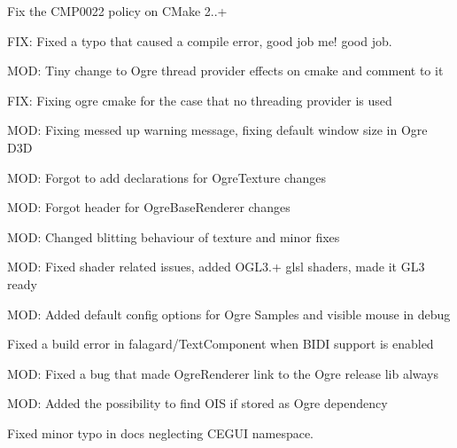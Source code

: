 \begin{DoxyItemize}
\item Fix the C\+M\+P0022 policy on C\+Make 2..+
\item F\+IX\+: Fixed a typo that caused a compile error, good job me! good job.
\item M\+OD\+: Tiny change to Ogre thread provider effects on cmake and comment to it
\item F\+IX\+: Fixing ogre cmake for the case that no threading provider is used
\item M\+OD\+: Fixing messed up warning message, fixing default window size in Ogre D3D
\item M\+OD\+: Forgot to add declarations for Ogre\+Texture changes
\item M\+OD\+: Forgot header for Ogre\+Base\+Renderer changes
\item M\+OD\+: Changed blitting behaviour of texture and minor fixes
\item M\+OD\+: Fixed shader related issues, added O\+G\+L3.+ glsl shaders, made it G\+L3 ready
\item M\+OD\+: Added default config options for Ogre Samples and visible mouse in debug
\item Fixed a build error in falagard/\+Text\+Component when B\+I\+DI support is enabled
\item M\+OD\+: Fixed a bug that made Ogre\+Renderer link to the Ogre release lib always
\item M\+OD\+: Added the possibility to find O\+IS if stored as Ogre dependency
\item Fixed minor typo in docs neglecting C\+E\+G\+UI namespace.
\end{DoxyItemize}

